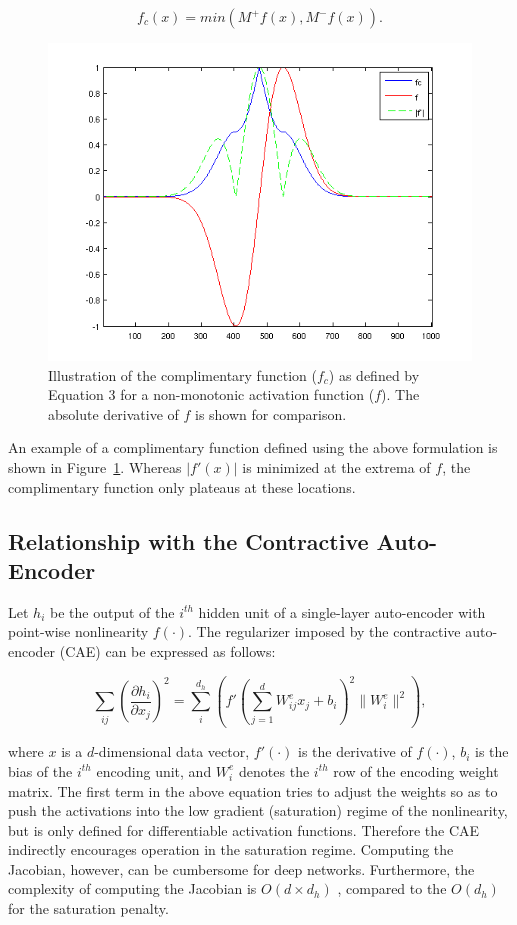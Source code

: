 \documentclass{article} %
\begin{document}
\begin{equation} 
f_c(x) = min(M^+f(x),M^-f(x)).
\end{equation} 

\begin{figure}
\centering 
\includegraphics[scale=0.5]{./Figures/diff_cc.png}
\caption{Illustration of the complimentary function ($f_c$) as defined by Equation 3 for a non-monotonic activation function ($f$). The absolute derivative of $f$ is shown for comparison.}  
\label{fig:diff_cc}
\end{figure} 

An example of a complimentary function defined using the above formulation is shown in Figure~\ref{fig:diff_cc}. Whereas $|f'(x)|$ is minimized at the extrema of $f$, the complimentary function only plateaus at these locations.

\subsection{Relationship with the Contractive Auto-Encoder} 
Let $h_i$ be the output of the $i^{th}$ hidden unit of a single-layer auto-encoder with point-wise nonlinearity $f(\cdot)$. The regularizer imposed by the contractive auto-encoder (CAE) can be expressed as follows: 

\begin{equation}
\nonumber
\sum_{ij} \left(\frac{\partial h_i}{\partial x_j} \right)^2 = \sum_i ^{d_h} \left(f'(\sum_{j=1}^d W^e_{ij}x_j + b_i)^2 \| W^e_i \| ^2 \right),
\end{equation}  
 
\noindent
where $x$ is a $d$-dimensional data vector, $f'(\cdot)$ is the derivative of $f(\cdot)$, $b_i$ is the bias of the $i^{th}$ encoding unit, and $W^e_i$ denotes the $i^{th}$ row of the encoding weight matrix. The first term in the above equation tries to adjust the weights so as to push the activations into the low gradient (saturation) regime of the nonlinearity, but is only defined for differentiable activation functions. Therefore the CAE indirectly encourages operation in the saturation regime. Computing the Jacobian, however, can be cumbersome for deep networks. Furthermore, the complexity of computing the Jacobian is $O(d \times d_h)$ \cite{CAE}, compared to the $O(d_h)$ for the saturation penalty.  
\end{document}
